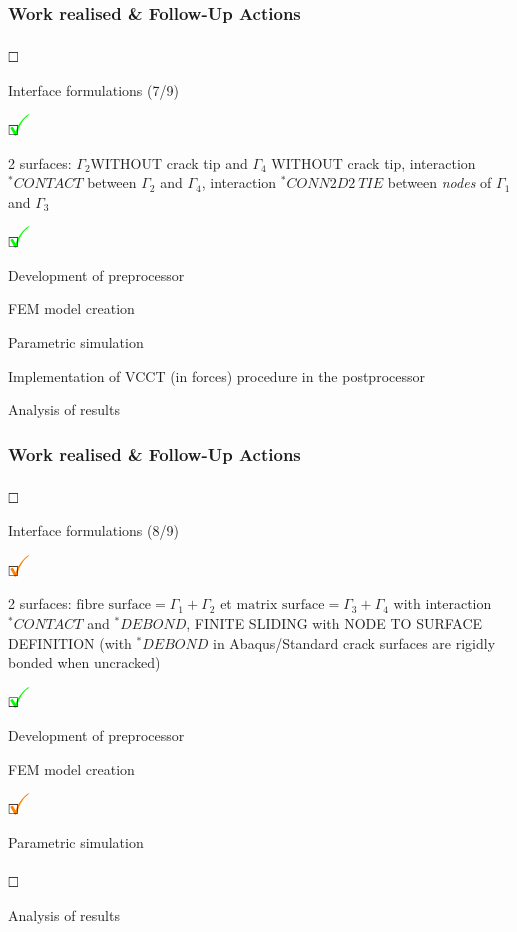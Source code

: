\documentclass[first,firstsupp,lastsupp,handout,last,hyperref,table]{ETHclass}
\begin{document}
\begin{frame}
\frametitle{Work realised \& Follow-Up Actions}
\vspace{-0.5cm}
\scriptsize
\begin{list}{$\text{\rlap{\textcolor{white}{\huge$\mathbf{\checkmark}$}}}\square$}{}  
\item Interface formulations (7/9)
\begin{list}{$\text{\rlap{\textcolor{green}{\huge$\mathbf{\checkmark}$}}}\square$}{}  
\item  2 surfaces: $\Gamma_{2}$WITHOUT crack tip and $\Gamma_{4}$ WITHOUT crack tip, interaction $^{*}CONTACT$ between  $\Gamma_{2}$ and $\Gamma_{4}$, interaction $^{*}CONN2D2\ TIE$ between \textit{nodes} of $\Gamma_{1}$ and $\Gamma_{3}$
\begin{list}{$\text{\rlap{\textcolor{green}{\huge$\mathbf{\checkmark}$}}}\square$}{}  
\item Development of preprocessor
\item FEM model creation
\item Parametric simulation
\item Implementation of VCCT (in forces) procedure in the postprocessor
\item Analysis of results
\end{list}
\end{list}
\end{list}
\end{frame}

\begin{frame}
\frametitle{Work realised \& Follow-Up Actions}
\vspace{-0.5cm}
\scriptsize
\begin{list}{$\text{\rlap{\textcolor{white}{\huge$\mathbf{\checkmark}$}}}\square$}{}  
\item Interface formulations (8/9)
\begin{list}{$\text{\rlap{\textcolor{orange}{\huge$\mathbf{\checkmark}$}}}\square$}{}  
\item  2 surfaces: $\text{fibre surface}=\Gamma_{1}+\Gamma_{2}$ et $\text{matrix surface}=\Gamma_{3}+\Gamma_{4}$ with interaction $^{*}CONTACT$ and $^{*}DEBOND$, FINITE SLIDING with NODE TO SURFACE DEFINITION (with $^{*}DEBOND$ in Abaqus/Standard crack surfaces are rigidly bonded when uncracked)
\begin{list}{$\text{\rlap{\textcolor{green}{\huge$\mathbf{\checkmark}$}}}\square$}{}  
\item Development of preprocessor
\item FEM model creation
\end{list}
\begin{list}{$\text{\rlap{\textcolor{orange}{\huge$\mathbf{\checkmark}$}}}\square$}{}
\item Parametric simulation
\end{list}
\begin{list}{$\text{\rlap{\textcolor{white}{\huge$\mathbf{\checkmark}$}}}\square$}{}
\item Analysis of results
\end{list}
\end{list}
\end{list}
\end{frame}
\end{document}

